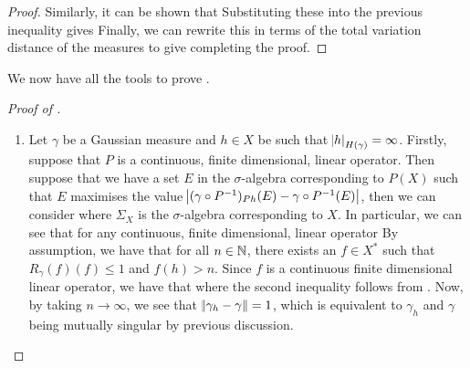 \documentclass[../main.tex]{subfiles}
\begin{document}
\begin{proof}
Similarly, it can be shown that  Substituting these into the previous inequality gives  Finally, we can rewrite this in terms of the total variation distance of the measures to give  completing the proof.
\end{proof}

We now have all the tools to prove .
\begin{proof}[Proof of ]
\begin{enumerate}
    \item Let $\gamma$ be a Gaussian measure and $h\in X$ be such that $\abs{h}_{H(\gamma)} = \infty$. Firstly, suppose that $P$ is a continuous, finite dimensional, linear operator. Then suppose that we have a set $E$ in the $\sigma$-algebra corresponding to $P(X)$ such that $E$ maximises the value $\abs{(\gamma\circ P^{-1})_{Ph}(E) - \gamma\circ P^{-1}(E)}$, then we can consider  where $\Sigma_X$ is the $\sigma$-algebra corresponding to $X$. In particular, we can see that for any continuous, finite dimensional, linear operator  By assumption, we have that for all $n\in\operatorname{\mathbb{N}}$, there exists an $f\in X^*$ such that $R_\gamma(f)(f)\leq 1$ and $f(h)>n$. Since $f$ is a continuous finite dimensional linear operator, we have that  where the second inequality follows from . Now, by taking $n\to\infty$, we see that $\norm{\gamma_h-\gamma} = 1$, which is equivalent to $\gamma_h$ and $\gamma$ being mutually singular by previous discussion.

\end{enumerate}
\end{proof}
\end{document}

